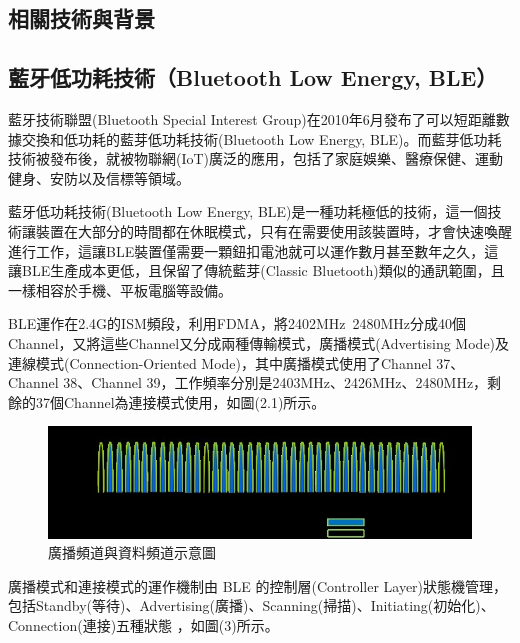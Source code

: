 \begin{ZhChapter}

\chapter{相關技術與背景}

\section{藍牙低功耗技術（Bluetooth Low Energy, BLE）}

藍牙技術聯盟(Bluetooth Special Interest Group)在2010年6月發布了可以短距離數據交換和低功耗的藍芽低功耗技術(Bluetooth Low Energy, BLE)。而藍芽低功耗技術被發布後，就被物聯網(IoT)廣泛的應用，包括了家庭娛樂、醫療保健、運動健身、安防以及信標等領域。

藍牙低功耗技術(Bluetooth Low Energy, BLE)是一種功耗極低的技術，這一個技術讓裝置在大部分的時間都在休眠模式，只有在需要使用該裝置時，才會快速喚醒進行工作，這讓BLE裝置僅需要一顆鈕扣電池就可以運作數月甚至數年之久，這讓BLE生產成本更低，且保留了傳統藍芽(Classic Bluetooth)類似的通訊範圍，且一樣相容於手機、平板電腦等設備。

BLE運作在2.4G的ISM頻段，利用FDMA，將2402MHz~2480MHz分成40個Channel，又將這些Channel又分成兩種傳輸模式，廣播模式(Advertising Mode)及連線模式(Connection-Oriented Mode)，其中廣播模式使用了Channel 37、Channel 38、Channel 39，工作頻率分別是2403MHz、2426MHz、2480MHz，剩餘的37個Channel為連接模式使用，如圖(2.1)所示。

\begin{figure}[htbp]
    \centering
    \includegraphics[width = 1\textwidth]{image/廣播頻道與資料頻道示意圖.jpg}
    \caption{廣播頻道與資料頻道示意圖\cite{microchip2023}}
    \label{fig: 廣播頻道與資料頻道示意圖}
\end{figure}

廣播模式和連接模式的運作機制由 BLE 的控制層(Controller Layer)狀態機管理，包括Standby(等待)、Advertising(廣播)、Scanning(掃描)、Initiating(初始化)、Connection(連接)五種狀態 ，如圖(3)所示。


\end{ZhChapter}
